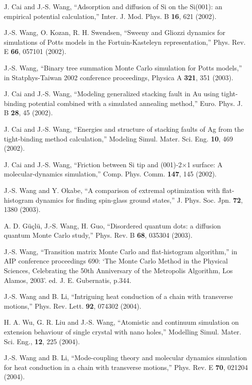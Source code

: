 \itm J. Cai and J.-S. Wang, ``Adsorption and diffusion of Si on the Si(001): 
an empirical potential calculation,'' Inter. J. Mod. Phys. B {\bf 16},
621 (2002).

\itm J.-S. Wang, O. Kozan, R. H. Swendsen, ``Sweeny
and Gliozzi dynamics for simulations of Potts models in the
Fortuin-Kasteleyn representation,'' Phys. Rev. E {\bf 66}, 057101 (2002).

\itm J.-S. Wang, ``Binary tree summation Monte Carlo simulation
for Potts models,'' in Statphys-Taiwan 2002 conference proceedings, 
Physica A {\bf 321}, 351 (2003).

\itm J. Cai and J.-S. Wang, ``Modeling generalized stacking fault in Au    
using tight-binding potential combined with a simulated annealing    
method,'' Euro. Phys. J. B {\bf 28}, 45 (2002).

\itm J. Cai and J.-S. Wang, ``Energies and structure of stacking    
faults of Ag from the tight-binding method calculation,'' 
Modeling Simul. Mater. Sci. Eng. {\bf 10}, 469 (2002).

\itm J. Cai and  J.-S. Wang, ``Friction between Si tip and (001)-2$\times$1
surface: A molecular-dynamics simulation,'' Comp. Phys. Comm.
{\bf 147}, 145 (2002).

\itm J.-S. Wang and Y. Okabe, ``A comparison of extremal optimization
with flat-histogram dynamics for finding spin-glass ground states,''
J. Phys. Soc. Jpn. {\bf 72}, 1380 (2003). 

\itm A. D. G\"u\c cl\"u, J.-S. Wang, H. Guo, 
``Disordered quantum dots: a diffusion quantum Monte Carlo study,''
Phys. Rev. B {\bf 68}, 035304 (2003). 

\itm J.-S. Wang, ``Transition matrix Monte Carlo and flat-histogram 
algorithm,'' in AIP conference proceedings 690: `The Monte Carlo Method in 
the Physical Sciences, Celebrating the 50th Anniversary of the Metropolis 
Algorithm, Los Alamos, 2003'. ed. J. E. Gubernatis, p.344. 

\itm J.-S. Wang and B. Li, ``Intriguing heat conduction of a chain with 
transverse motions,'' Phys. Rev. Lett. {\bf 92}, 074302 (2004). 

\itm H. A. Wu, G. R. Liu and J.-S. Wang, ``Atomistic and continuum simulation 
on extension behaviour of single crystal with nano holes,'' Modelling Simul. 
Mater. Sci. Eng., {\bf 12}, 225 (2004). 

\itm J.-S. Wang and B. Li, ``Mode-coupling theory and molecular dynamics simulation 
for heat conduction in a chain with transverse motions,'' Phys. Rev. E {\bf 70}, 021204 (2004).  

